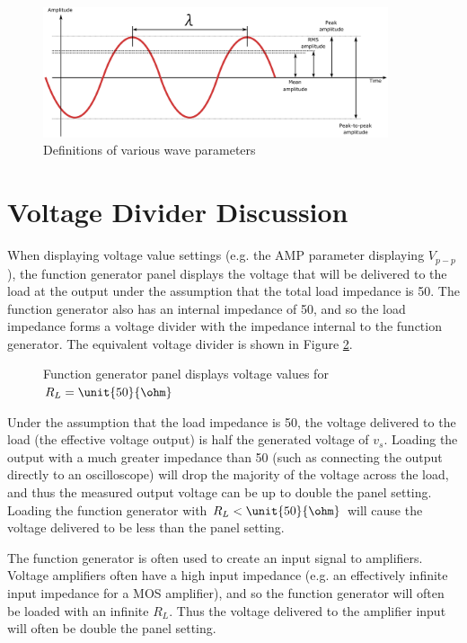 \documentclass{article}
\begin{document}
\begin{figure}[!htb]
  \centering
  \includegraphics[width=4.0in]{amplitude.eps}
  \caption{Definitions of various wave parameters}
  \label{amplitude}
\end{figure}

\section{Voltage Divider Discussion}
\label{voltagedivider}
When displaying voltage value settings (e.g. the AMP parameter displaying $V_{p-p}$), the function generator panel displays the voltage that will be delivered to the load at the output under the assumption that the total load impedance is \unit{50}{\ohm}. The function generator also has an internal impedance of \unit{50}{\ohm}, and so the load impedance forms a voltage divider with the impedance internal to the function generator. The equivalent voltage divider is shown in Figure \ref{divider}.

\begin{figure}[!htb]
  
  \centerline{\box\graph}
  \caption{Function generator panel displays voltage values for $R_L=\unit{50}{\ohm}$}
  \label{divider}
\end{figure}

Under the assumption that the load impedance is \unit{50}{\ohm}, the voltage delivered to the load (the effective voltage output) is half the generated voltage of $v_s$. Loading the output with a much greater impedance than \unit{50}{\ohm} (such as connecting the output directly to an oscilloscope) will drop the majority of the voltage across the load, and thus the measured output voltage can be up to double the panel setting. Loading the function generator with $R_L < \unit{50}{\ohm}$ will cause the voltage delivered to be less than the panel setting.

The function generator is often used to create an input signal to amplifiers. Voltage amplifiers often have a high input impedance (e.g. an effectively infinite input impedance for a MOS amplifier), and so the function generator will often be loaded with an infinite $R_L$. Thus the voltage delivered to the amplifier input will often be double the panel setting.
\end{document}
